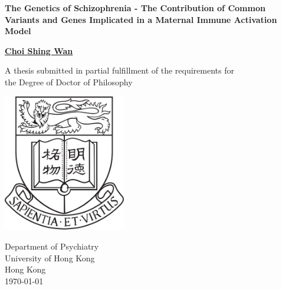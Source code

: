 \documentclass[12pt]{scrbook}
\begin{document}
\thispagestyle{empty}
\pagestyle{empty}
\begin{singlespace}
	\begin{titlepage}
		\begin{center}
			\vspace*{1cm}
			
			\Huge
			\textbf{The Genetics of Schizophrenia - The Contribution of Common Variants and Genes Implicated in a Maternal Immune Activation Model}
			
			\vspace{0.5cm}
			\LARGE
			
			\vspace{1.5cm}
			
			\textbf{\href{mailto:choishingwan@gmail.com}{Choi Shing Wan}}
			
			\vfill
			
			A thesis submitted in partial fulfillment of the requirements for \\
			the Degree of Doctor of Philosophy
			
			\vspace{0.8cm}
			
			\includegraphics[width=0.4\textwidth]{figure/hkuLogo.jpg}
			
			\Large
			Department of Psychiatry\\
			University of Hong Kong\\
			Hong Kong\\
			\today
		\end{center}
	\end{titlepage}
\end{singlespace}

\frontmatter 
\cleardoublepage
{}
{}
\end{document}

